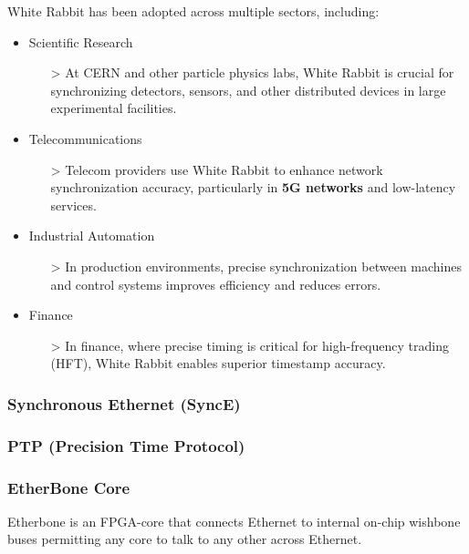 \vspace{5 mm}

\noindent White Rabbit has been adopted across multiple sectors, including:

\begin{itemize}
\item Scientific Research
    \begin{itemize}
    \item[>] At CERN and other particle physics labs, White Rabbit is crucial for synchronizing detectors, sensors, and other distributed devices in large experimental facilities.
    \end{itemize}
\item Telecommunications
    \begin{itemize}
    \item[>] Telecom providers use White Rabbit to enhance network synchronization accuracy, particularly in \textbf{5G networks} and low-latency services.
    \end{itemize}
\item Industrial Automation
    \begin{itemize}
    \item[>] In production environments, precise synchronization between machines and control systems improves efficiency and reduces errors.
    \end{itemize}
\item Finance
    \begin{itemize}
    \item[>] In finance, where precise timing is critical for high-frequency trading (HFT), White Rabbit enables superior timestamp accuracy.
    \end{itemize}
\end{itemize}

\subsubsection{Synchronous Ethernet (SyncE)}

\subsubsection{PTP (Precision Time Protocol)}

\subsubsection{EtherBone Core}

Etherbone \cite{etherbone-core:ohwr} \cite{etherbone-core:spec} is an FPGA-core that connects Ethernet to internal on-chip wishbone buses permitting any core to talk to any other across Ethernet.

